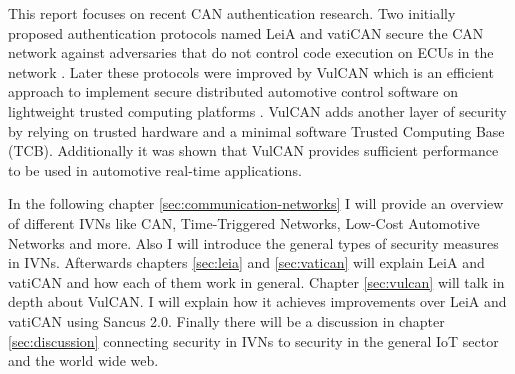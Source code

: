 This report focuses on recent CAN authentication research. Two initially
proposed authentication protocols named LeiA and vatiCAN secure the CAN network
against adversaries that do not control code execution on ECUs in the network
\cite{Nurnberger2016,Radu2016}. Later these protocols were improved by VulCAN
which is an efficient approach to implement secure distributed automotive
control software on lightweight trusted computing platforms \cite{VanBulck2017}.
VulCAN adds another layer of security by relying on trusted hardware and a
minimal software Trusted Computing Base (TCB). Additionally it was shown that
VulCAN provides sufficient performance to be used in automotive real-time
applications.

In the following chapter \ref{sec:communication-networks} I will provide an
overview of different IVNs like CAN, Time-Triggered Networks, Low-Cost
Automotive Networks and more. Also I will introduce the general types of
security measures in IVNs. Afterwards chapters \ref{sec:leia} and
\ref{sec:vatican} will explain LeiA and vatiCAN and how each of them work in
general. Chapter \ref{sec:vulcan} will talk in depth about VulCAN. I will
explain how it achieves improvements over LeiA and vatiCAN using Sancus 2.0.
Finally there will be a discussion in chapter \ref{sec:discussion} connecting security in IVNs to security in
the general IoT sector and the world wide web.
